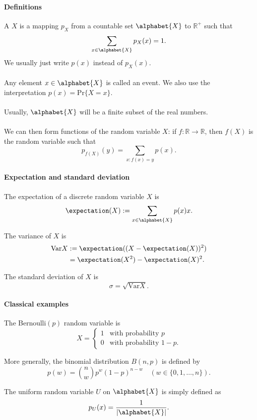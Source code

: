 \documentclass[a4paper, 11pt, openany]{book}
\begin{document}
\paragraph{Definitions}
A  $X$ is a mapping $p_X$ from a countable set $\alphabet{X}$ to $\mathbb{R}^+$ such that
$$
	\sum_{x \in \alphabet{X}} p_X(x) = 1.
$$
We usually just write $p(x)$ instead of $p_X(x)$.\\
~\\
Any element $x \in \alphabet{X}$ is called an event. We also use the interpretation $p(x) = \mathrm{Pr}\{X = x\}$.\\
~\\
Usually, $\alphabet{X}$ will be a finite subset of the real numbers.\\
~\\
We can then form functions of the random variable $X$: if $f: \mathbb{R} \to \mathbb{R}$, then $f(X)$ is the random variable such that
$$
	p_{f(X)}(y) = \sum_{x : f(x) = y} p(x).
$$


\paragraph{Expectation and standard deviation}
The expectation of a discrete random variable $X$ is
$$
	\expectation (X) := \sum_{x \in \alphabet{X}} p(x) x.
$$

The variance of $X$ is
\begin{align*}
	\mathrm{Var} X 	&:= \expectation( (X - \expectation(X) )^2)\\
					&=\expectation (X^2) - \expectation (X)^2.
\end{align*}

The standard deviation of $X$ is
$$
	\sigma =\sqrt{\mathrm{Var} X}.
$$



\paragraph{Classical examples}
The Bernoulli$(p)$ random variable is
$$
	X = \begin{cases}
		1 &\text{with probability } p\\
		0 &\text{with probability } 1-p.
		\end{cases}
$$

More generally, the binomial distribution $B(n,p)$ is defined by
$$
	p(w) = \binom{n}{w} p^w (1-p)^{n-w} \quad (w \in \{0,1, \dots, n\}).
$$

The uniform random variable $U$ on $\alphabet{X}$ is simply defined as
$$
	p_U(x) = \frac{1}{|\alphabet{X}|}.
$$
\end{document}
